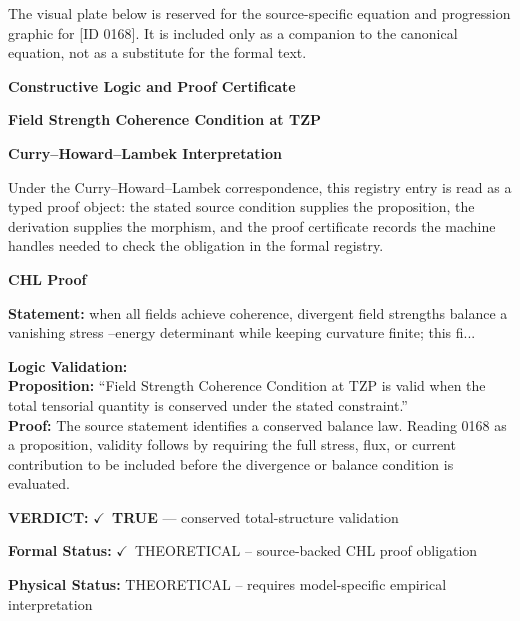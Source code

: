 \begingroup\footnotesize\sloppy
The visual plate below is reserved for the source-specific equation and progression graphic for [ID 0168]. It is included only as a companion to the canonical equation, not as a substitute for the formal text.
\par\endgroup
\ifTZPDarkEdition
{}
\fi

\clearpage
\begingroup\tzpsupportsetup
\noindent\textbf{\fontsize{10.8pt}{12.8pt}\selectfont [ID 0168] Constructive Logic and Proof Certificate}\par
\noindent\textbf{\fontsize{10pt}{12pt}\selectfont Field Strength Coherence Condition at TZP}\par
\vspace{0.45em}
\begingroup
\footnotesize
\setlength{\parskip}{0.22em}
\setlength{\parindent}{0pt}
\noindent\textbf{Curry--Howard--Lambek Interpretation}\par
Under the Curry--Howard--Lambek correspondence, this registry entry is read as a typed proof
object: the stated source condition supplies the proposition, the derivation supplies the
morphism, and the proof certificate records the machine handles needed to check the obligation
in the formal registry.

\vspace{0.45em}
\noindent\textbf{CHL Proof}\par
\textbf{Statement:} when all fields achieve coherence, divergent field strengths balance a vanishing stress
--energy determinant while keeping curvature finite; this fi...

\textbf{Logic Validation:}\\
\textbf{Proposition:} ``Field Strength Coherence Condition at TZP is valid when the total tensorial quantity is
conserved under the stated constraint.''\\
\textbf{Proof:} The source statement identifies a conserved balance law. Reading 0168 as a proposition,
validity follows by requiring the full stress, flux, or current contribution to be
included before the divergence or balance condition is evaluated.

\textbf{VERDICT:} \ensuremath{\checkmark}\ \textbf{TRUE} --- conserved total-structure validation

\textbf{Formal Status:} \ensuremath{\checkmark}\ THEORETICAL -- source-backed CHL proof obligation

\textbf{Physical Status:} THEORETICAL -- requires model-specific empirical interpretation
\par\vspace{0.45em}
\par
\ifTZPDarkEdition
{}
\fi
\endgroup
\endgroup
